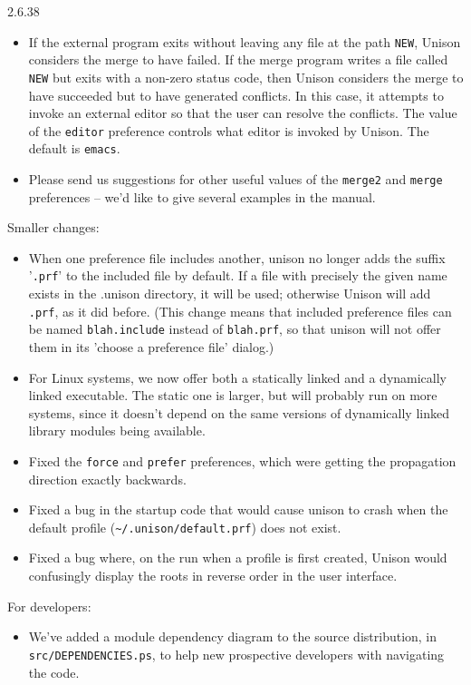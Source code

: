 \begin{changesfromversion}{2.6.38}
\begin{itemize}
\begin{itemize}
  \item If the external program exits without leaving any file at the
  path \verb|NEW|, 
      Unison considers the merge to have failed.  If the merge program writes
      a file called \verb|NEW| but exits with a non-zero status code,
      then Unison 
      considers the merge to have succeeded but to have generated conflicts.
      In this case, it attempts to invoke an external editor so that the
      user can resolve the conflicts.  The value of the \verb|editor| 
      preference controls what editor is invoked by Unison.  The default
      is \verb|emacs|.

  \item Please send us suggestions for other useful values of the
       \verb|merge2| and \verb|merge| preferences -- we'd like to give several 
       examples in the manual.
\end{itemize}
\end{itemize}

\item Smaller changes:
\begin{itemize}
\item When one preference file includes another, unison no longer adds the
  suffix '\verb|.prf|' to the included file by default.  If a file with 
  precisely the given name exists in the .unison directory, it will be used; 
  otherwise Unison will 
  add \verb|.prf|, as it did before.  (This change means that included 
  preference files can be named \verb|blah.include| instead of 
  \verb|blah.prf|, so that unison will not offer them in its 'choose 
  a preference file' dialog.)
\item For Linux systems, we now offer both a statically linked and a dynamically
  linked executable.  The static one is larger, but will probably run on more
  systems, since it doesn't depend on the same versions of dynamically
  linked library modules being available.
\item Fixed the \verb|force| and \verb|prefer| preferences, which were
  getting the propagation direction exactly backwards.
\item Fixed a bug in the startup code that would cause unison to crash
  when the default profile (\verb|~/.unison/default.prf|) does not exist.
\item Fixed a bug where, on the run when a profile is first created, 
  Unison would confusingly display the roots in reverse order in the user
  interface.
\end{itemize}

\item For developers:
\begin{itemize}
\item We've added a module dependency diagram to the source distribution, in
   \verb|src/DEPENDENCIES.ps|, to help new prospective developers with
   navigating the code. 
\end{itemize}
\end{changesfromversion}

